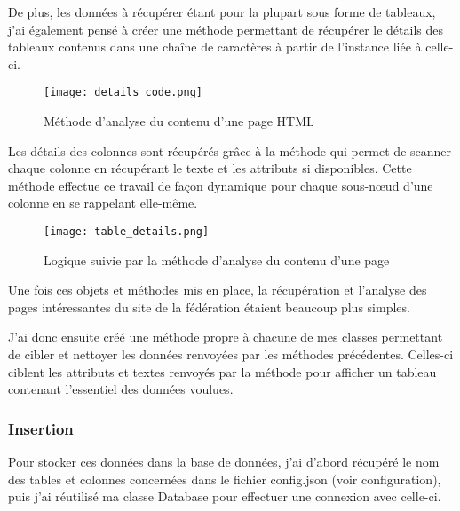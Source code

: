 De plus, les données à récupérer étant pour la plupart sous forme de tableaux, j’ai également pensé à créer une méthode permettant de récupérer le détails des tableaux contenus dans une chaîne de caractères à partir de l’instance  liée à celle-ci.

\newpage

\begin{figure}[!h]
    \centering
    \texttt{[image: details\_code.png]}
    \caption{Méthode d'analyse du contenu d'une page HTML}
\end{figure}

\vspace{0.5cm}

Les détails des colonnes sont récupérés grâce à la méthode  qui permet de scanner chaque colonne en récupérant le texte et les attributs si disponibles. Cette méthode effectue ce travail de façon dynamique pour chaque sous-nœud d’une colonne en se rappelant elle-même.

\newpage

\begin{figure}[!h]
    \centering
    \texttt{[image: table\_details.png]}
    \caption{Logique suivie par la méthode d'analyse du contenu d'une page}
\end{figure}

\vspace{0.5cm}

Une fois ces objets et méthodes mis en place, la récupération et l’analyse des pages intéressantes du site de la fédération étaient beaucoup plus simples. 

J’ai donc ensuite créé une méthode propre à chacune de mes classes permettant de cibler et nettoyer les données renvoyées par les méthodes précédentes. Celles-ci ciblent les attributs et textes renvoyés par la méthode  pour afficher un tableau contenant l’essentiel des données voulues.

\newpage

\subsubsection{Insertion}
\vspace{1cm}

Pour stocker ces données dans la base de données, j’ai d’abord récupéré le nom des tables et colonnes concernées dans le fichier config.json (voir configuration), puis j’ai réutilisé ma classe Database pour effectuer une connexion avec celle-ci.

